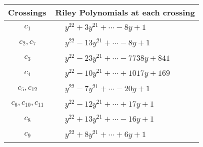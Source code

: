 \documentclass[1p]{elsarticle_modified}
\theoremstyle{definition}
\begin{document}
\begin{tabular}{m{50pt}|m{274pt}}
Crossings & \hspace{64pt}Riley Polynomials at each crossing \\
\hline $$\begin{aligned}c_{1}\end{aligned}$$&$\begin{aligned}
&y^{22}+3 y^{21}+\cdots-8 y+1
\end{aligned}$\\
\hline $$\begin{aligned}c_{2},c_{7}\end{aligned}$$&$\begin{aligned}
&y^{22}-13 y^{21}+\cdots-8 y+1
\end{aligned}$\\
\hline $$\begin{aligned}c_{3}\end{aligned}$$&$\begin{aligned}
&y^{22}-23 y^{21}+\cdots-7738 y+841
\end{aligned}$\\
\hline $$\begin{aligned}c_{4}\end{aligned}$$&$\begin{aligned}
&y^{22}-10 y^{21}+\cdots+1017 y+169
\end{aligned}$\\
\hline $$\begin{aligned}c_{5},c_{12}\end{aligned}$$&$\begin{aligned}
&y^{22}-7 y^{21}+\cdots-20 y+1
\end{aligned}$\\
\hline $$\begin{aligned}c_{6},c_{10},c_{11}\end{aligned}$$&$\begin{aligned}
&y^{22}-12 y^{21}+\cdots+17 y+1
\end{aligned}$\\
\hline $$\begin{aligned}c_{8}\end{aligned}$$&$\begin{aligned}
&y^{22}+13 y^{21}+\cdots-16 y+1
\end{aligned}$\\
\hline $$\begin{aligned}c_{9}\end{aligned}$$&$\begin{aligned}
&y^{22}+8 y^{21}+\cdots+6 y+1
\end{aligned}$\\
\hline
\end{tabular}\\~\\
\end{document}
